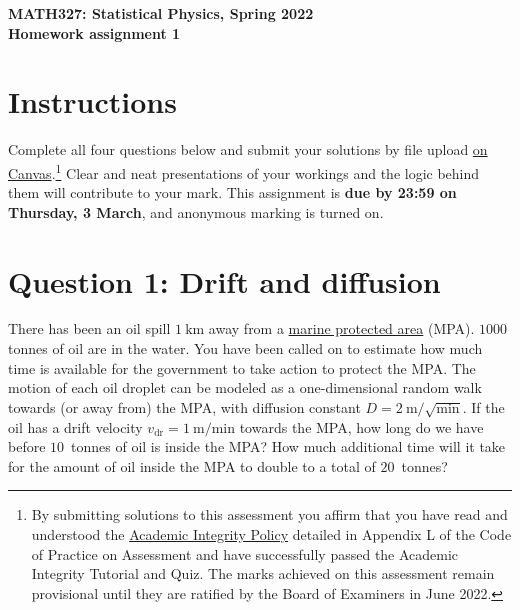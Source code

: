 \documentclass[12 pt]{article} %
\newcommand{\vdr}{\ensuremath{v_{\mathrm{dr}}} }
\begin{document}
\newcommand{\thisweek}{MATH327 Homework 1}
\newcommand{\moddate}{Last modified 21 Feb.~2022}
\begin{center}
  {\Large \textbf{MATH327: Statistical Physics, Spring 2022}} \\[12 pt]
  {\Large \textbf{Homework assignment 1}} \\[24 pt]
\end{center}

\section*{Instructions}
Complete all four questions below and submit your solutions by file upload \href{https://liverpool.instructure.com/courses/47333/assignments/178542}{on Canvas}.\footnote{By submitting solutions to this assessment you affirm that you have read and understood the \href{https://www.liverpool.ac.uk/media/livacuk/tqsd/code-of-practice-on-assessment/appendix_L_cop_assess.pdf}{Academic Integrity Policy} detailed in Appendix L of the Code of Practice on Assessment and have successfully passed the Academic Integrity Tutorial and Quiz.  The marks achieved on this assessment remain provisional until they are ratified by the Board of Examiners in June 2022.}
Clear and neat presentations of your workings and the logic behind them will contribute to your mark.
This assignment is \textbf{due by 23:59 on Thursday, 3 March}, and anonymous marking is turned on.



\section*{Question 1: Drift and diffusion}
There has been an oil spill $1~\mathrm{km}$ away from a \href{https://en.wikipedia.org/wiki/Marine_protected_area}{marine protected area} (MPA).
$1000$ tonnes of oil are in the water.
You have been called on to estimate how much time is available for the government to take action to protect the MPA.
The motion of each oil droplet can be modeled as a one-dimensional random walk towards (or away from) the MPA, with diffusion constant $D = 2~\mathrm{m}/\sqrt{\mathrm{min}}$.
If the oil has a drift velocity $\vdr = 1~\mathrm{m}/\mathrm{min}$ towards the MPA, how long do we have before $10$~tonnes of oil is inside the MPA?
How much additional time will it take for the amount of oil inside the MPA to double to a total of $20$~tonnes?
\end{document}
